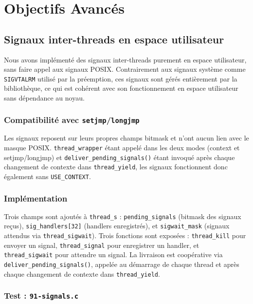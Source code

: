 \section{Objectifs Avancés} 
\subsection{Signaux inter-threads en espace utilisateur}

Nous avons implémenté des signaux inter-threads purement en espace utilisateur,
sans faire appel aux signaux POSIX. Contrairement aux signaux système comme
\texttt{SIGVTALRM} utilisé par la préemption, ces signaux sont gérés entièrement
par la bibliothèque, ce qui est cohérent avec son fonctionnement en espace
utilisateur sans dépendance au noyau.

\subsubsection{Compatibilité avec \texttt{setjmp}/\texttt{longjmp}}

Les signaux reposent sur leurs propres champs bitmask et n'ont aucun lien avec
le masque POSIX. \texttt{thread\_wrapper} étant appelé dans les deux modes (context et setjmp/longjmp) et
\texttt{deliver\_pending\_signals()} étant invoqué après chaque changement de
contexte dans \texttt{thread\_yield}, les signaux fonctionnent donc également sans
\texttt{USE\_CONTEXT}.

\subsubsection{Implémentation}

Trois champs sont ajoutés à \texttt{thread\_s} : \texttt{pending\_signals}
(bitmask des signaux reçus), \texttt{sig\_handlers[32]} (handlers enregistrés),
et \texttt{sigwait\_mask} (signaux attendus via \texttt{thread\_sigwait}).
Trois fonctions sont exposées : \texttt{thread\_kill} pour envoyer un signal,
\texttt{thread\_signal} pour enregistrer un handler, et \texttt{thread\_sigwait}
pour attendre un signal. La livraison est coopérative via
\texttt{deliver\_pending\_signals()}, appelée au démarrage de chaque thread et
après chaque changement de contexte dans \texttt{thread\_yield}.

\subsubsection{Test : \texttt{91-signals.c}}

